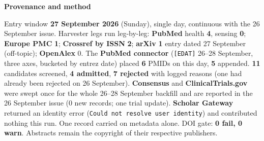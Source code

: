 \documentclass[10pt]{article}
\begin{document}


\vspace{2mm}

\begin{keybox}
{\sffamily\bfseries\footnotesize\color{Deep}Provenance and method}\\[1.2mm]
{\fontsize{7.2}{8.8}\selectfont
Entry window \textbf{27 September 2026} (Sunday), single day, continuous with the 26 September
issue. Harvester legs run leg-by-leg: \textbf{PubMed} health \textbf{4}, sensing \textbf{0};
\textbf{Europe PMC} \textbf{1}; \textbf{Crossref by ISSN} \textbf{2}; \textbf{arXiv} \textbf{1} entry
dated 27 September (off-topic); \textbf{OpenAlex} 0. The \textbf{PubMed connector} (\texttt{[EDAT]}
26--28 September, three axes, bucketed by entrez date) placed \textbf{6} PMIDs on this day, \textbf{5}
appended. \textbf{11} candidates screened, \textbf{4 admitted}, \textbf{7 rejected} with logged reasons
(one had already been rejected on 26 September). \textbf{Consensus} and \textbf{ClinicalTrials.gov}
were swept once for the whole 26--28 September backfill and are reported in the 26 September issue
(0 new records; one trial update). \textbf{Scholar Gateway} returned an identity error
(\texttt{Could not resolve user identity}) and contributed nothing this run. One record carried on
metadata alone. DOI gate: \textbf{0 fail, 0 warn}. Abstracts remain the copyright of their
respective publishers.\par}
\end{keybox}
\end{document}
